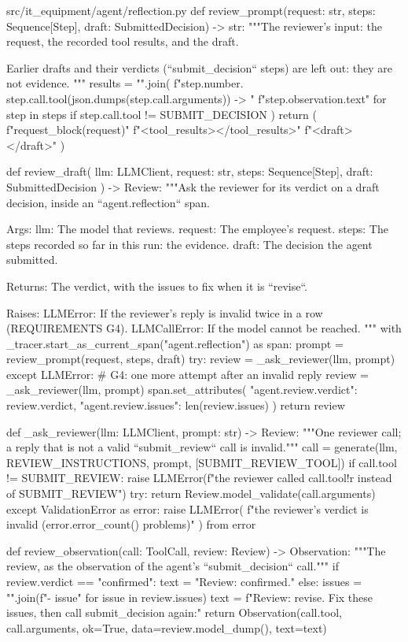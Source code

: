 \documentclass[11pt,letterpaper]{article}
\renewcommand{\_}{\textunderscore\allowbreak}
\begin{document}
\begin{codebox}{src/it_equipment/agent/reflection.py}
def review_prompt(request: str, steps: Sequence[Step], draft: SubmittedDecision) -> str:
    """The reviewer's input: the request, the recorded tool results, and the draft.

    Earlier drafts and their verdicts (``submit_decision`` steps) are left out: they are not
    evidence.
    """
    results = "\n".join(
        f"{step.number}. {step.call.tool}({json.dumps(step.call.arguments)}) -> "
        f"{step.observation.text}"
        for step in steps
        if step.call.tool != SUBMIT_DECISION
    )
    return (
        f"{request_block(request)}\n\n"
        f"<tool_results>\n</tool_results>\n\n"
        f"<draft>\n</draft>"
    )


def review_draft(
    llm: LLMClient, request: str, steps: Sequence[Step], draft: SubmittedDecision
) -> Review:
    """Ask the reviewer for its verdict on a draft decision, inside an ``agent.reflection`` span.

    Args:
        llm: The model that reviews.
        request: The employee's request.
        steps: The steps recorded so far in this run: the evidence.
        draft: The decision the agent submitted.

    Returns:
        The verdict, with the issues to fix when it is ``revise``.

    Raises:
        LLMError: If the reviewer's reply is invalid twice in a row (REQUIREMENTS G4).
        LLMCallError: If the model cannot be reached.
    """
    with _tracer.start_as_current_span("agent.reflection") as span:
        prompt = review_prompt(request, steps, draft)
        try:
            review = _ask_reviewer(llm, prompt)
        except LLMError:  # G4: one more attempt after an invalid reply
            review = _ask_reviewer(llm, prompt)
        span.set_attributes(
            {"agent.review.verdict": review.verdict, "agent.review.issues": len(review.issues)}
        )
        return review


def _ask_reviewer(llm: LLMClient, prompt: str) -> Review:
    """One reviewer call; a reply that is not a valid ``submit_review`` call is invalid."""
    call = generate(llm, REVIEW_INSTRUCTIONS, prompt, [SUBMIT_REVIEW_TOOL])
    if call.tool != SUBMIT_REVIEW:
        raise LLMError(f"the reviewer called {call.tool!r} instead of {SUBMIT_REVIEW}")
    try:
        return Review.model_validate(call.arguments)
    except ValidationError as error:
        raise LLMError(
            f"the reviewer's verdict is invalid ({error.error_count()} problems)"
        ) from error


def review_observation(call: ToolCall, review: Review) -> Observation:
    """The review, as the observation of the agent's ``submit_decision`` call."""
    if review.verdict == "confirmed":
        text = "Review: confirmed."
    else:
        issues = "\n".join(f"- {issue}" for issue in review.issues)
        text = f"Review: revise. Fix these issues, then call submit_decision again:"
    return Observation(call.tool, call.arguments, ok=True, data=review.model_dump(), text=text)
\end{codebox}
\end{document}

